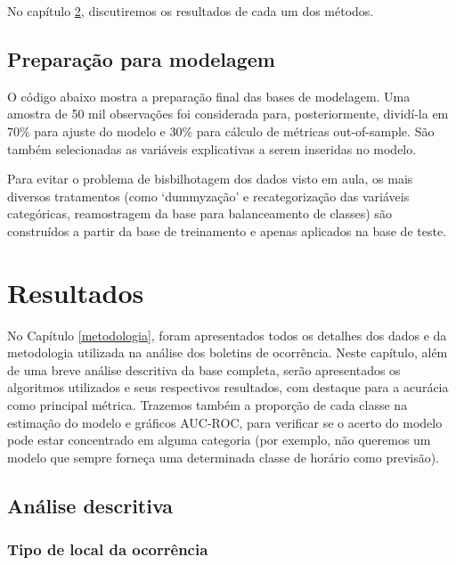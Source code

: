 \documentclass[
  12pt,
]{report}
\begin{document}
No capítulo \ref{resultados}, discutiremos os resultados de cada um dos métodos.

\hypertarget{preparauxe7uxe3o-para-modelagem}{%
\section{Preparação para modelagem}\label{preparauxe7uxe3o-para-modelagem}}

O código abaixo mostra a preparação final das bases de modelagem. Uma amostra de 50 mil observações foi considerada para, posteriormente, dividí-la em 70\% para ajuste do modelo e 30\% para cálculo de métricas out-of-sample. São também selecionadas as variáveis explicativas a serem inseridas no modelo.

Para evitar o problema de bisbilhotagem dos dados visto em aula, os mais diversos tratamentos (como `dummyzação' e recategorização das variáveis categóricas, reamostragem da base para balanceamento de classes) são construídos a partir da base de treinamento e apenas aplicados na base de teste.

\hypertarget{resultados}{%
\chapter{Resultados}\label{resultados}}

No Capítulo \ref{metodologia}, foram apresentados todos os detalhes dos dados e da metodologia utilizada na análise dos boletins de ocorrência. Neste capítulo, além de uma breve análise descritiva da base completa, serão apresentados os algoritmos utilizados e seus respectivos resultados, com destaque para a acurácia como principal métrica. Trazemos também a proporção de cada classe na estimação do modelo e gráficos AUC-ROC, para verificar se o acerto do modelo pode estar concentrado em alguma categoria (por exemplo, não queremos um modelo que sempre forneça uma determinada classe de horário como previsão).

\hypertarget{descritiva}{%
\section{Análise descritiva}\label{descritiva}}

\hypertarget{tipo-de-local-da-ocorruxeancia}{%
\subsection{Tipo de local da ocorrência}\label{tipo-de-local-da-ocorruxeancia}}
\end{document}
